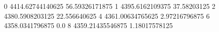 0 4414.62744140625 56.59326171875
1 4395.6162109375 37.58203125
2 4380.5908203125 22.556640625
4 4361.00634765625 2.97216796875
6 4358.0341796875 0.0
8 4359.21435546875 1.18017578125
